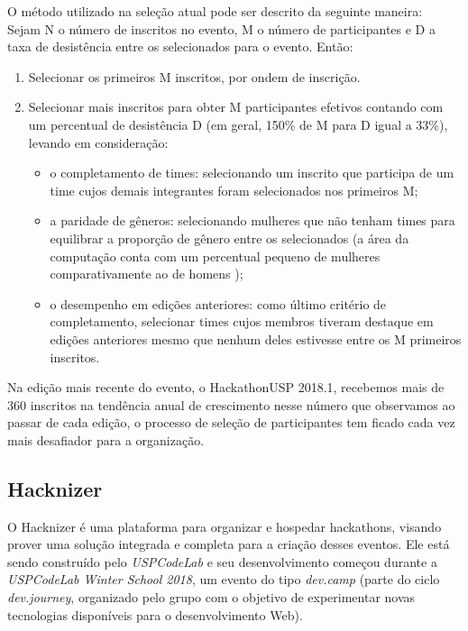 \documentclass[10pt,twoside,a4paper]{article}
\begin{document}
    O método utilizado na seleção atual pode ser descrito da seguinte maneira: \\
    
    Sejam N o número de inscritos no evento, M o número de participantes e D a taxa de desistência entre os selecionados para o evento. Então:
    
    \begin{enumerate}
      \item Selecionar os primeiros M inscritos, por ondem de inscrição.
     
      \item Selecionar mais inscritos para obter M participantes efetivos contando com um percentual de desistência D (em geral, 150\% de M para D igual a 33\%), levando em consideração: 
      
      \begin{itemize}
          \item o completamento de times: selecionando um inscrito que participa de um time cujos demais integrantes foram selecionados nos primeiros M;
          \item a paridade de gêneros: selecionando mulheres que não tenham times para equilibrar a proporção de gênero entre os selecionados (a área da computação conta com um percentual pequeno de mulheres comparativamente ao de homens \cite{Frenkel1990WomenComputing});
          \item o desempenho em edições anteriores: como último critério de completamento, selecionar times cujos membros tiveram destaque em edições anteriores mesmo que nenhum deles estivesse entre os M primeiros inscritos.
      \end{itemize}   
    \end{enumerate}
    
        
    Na edição mais recente do evento, o HackathonUSP 2018.1, recebemos mais de 360 inscritos na tendência anual de crescimento nesse número que observamos ao passar de cada edição, o processo de seleção de participantes tem ficado cada vez mais desafiador para a organização.
    
  \subsection{Hacknizer}

    O Hacknizer é uma plataforma para organizar e hospedar hackathons, visando prover uma solução integrada e completa para a criação desses eventos. Ele está sendo construído pelo \textit{USPCodeLab} e seu desenvolvimento começou durante a \textit{USPCodeLab Winter School 2018}, um evento do tipo \textit{dev.camp} (parte do ciclo \textit{dev.journey}, organizado pelo grupo com o objetivo de experimentar novas tecnologias disponíveis para o desenvolvimento Web).
    
\end{document}
